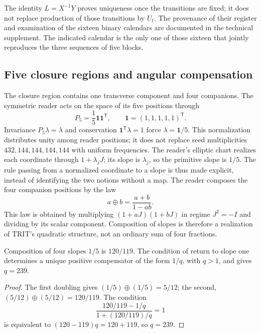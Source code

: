 The identity \(L=X^{-1}Y\) proves uniqueness once the transitions are fixed; it does not replace production of those transitions by \(U_t\). The provenance of their register and examination of the sixteen binary calendars are documented in the technical supplement. The indicated calendar is the only one of those sixteen that jointly reproduces the three sequences of five blocks.

\subsection{Five closure regions and angular compensation}

The closure region contains one transverse component and four companions. The symmetric reader acts on the space of its five positions through
\[
 P_5=\frac15\mathbf1\mathbf1^{\mathsf T},\qquad
 \mathbf1=(1,1,1,1,1)^{\mathsf T}.
\]
Invariance \(P_5\lambda=\lambda\) and conservation \(\mathbf1^{\mathsf T}\lambda=1\) force \(\lambda=\mathbf1/5\). This normalization distributes unity among reader positions; it does not replace seed multiplicities \(432,144,144,144,144\) with uniform frequencies. The reader's elliptic chart realizes each coordinate through \(1+\lambda_jJ\); its slope is \(\lambda_j\), so the primitive slope is \(1/5\). The rule passing from a normalized coordinate to a slope is thus made explicit, instead of identifying the two notions without a map. The reader composes the four companion positions by the law
\begin{equation}
 a\oplus b=\frac{a+b}{1-ab}.
 \label{x_reciprocidad:eq:suma-pendientes}
\end{equation}
This law is obtained by multiplying \((1+aJ)(1+bJ)\) in regime \(J^2=-I\) and dividing by its scalar component. Composition of slopes is therefore a realization of TRIT's quadratic structure, not an ordinary sum of four fractions.

\begin{proposition}
Composition of four slopes \(1/5\) is \(120/119\). The condition of return to slope one determines a unique positive compensator of the form \(1/q\), with \(q>1\), and gives \(q=239\).
\end{proposition}
\begin{proof}
The first doubling gives \((1/5)\oplus(1/5)=5/12\); the second, \((5/12)\oplus(5/12)=120/119\). The condition
\[
 \frac{120/119-1/q}{1+(120/119)/q}=1
\]
is equivalent to \((120-119)q=120+119\), so \(q=239\).
\end{proof}


